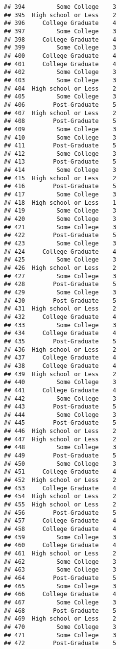 \documentclass[
]{article}
\begin{document}
\begin{verbatim}
## 394         Some College    3
## 395  High school or Less    2
## 396     College Graduate    4
## 397         Some College    3
## 398     College Graduate    4
## 399         Some College    3
## 400     College Graduate    4
## 401     College Graduate    4
## 402         Some College    3
## 403         Some College    3
## 404  High school or Less    2
## 405         Some College    3
## 406        Post-Graduate    5
## 407  High school or Less    2
## 408        Post-Graduate    5
## 409         Some College    3
## 410         Some College    3
## 411        Post-Graduate    5
## 412         Some College    3
## 413        Post-Graduate    5
## 414         Some College    3
## 415  High school or Less    2
## 416        Post-Graduate    5
## 417         Some College    3
## 418  High school or Less    1
## 419         Some College    3
## 420         Some College    3
## 421         Some College    3
## 422        Post-Graduate    5
## 423         Some College    3
## 424     College Graduate    4
## 425         Some College    3
## 426  High school or Less    2
## 427         Some College    3
## 428        Post-Graduate    5
## 429         Some College    3
## 430        Post-Graduate    5
## 431  High school or Less    2
## 432     College Graduate    4
## 433         Some College    3
## 434     College Graduate    4
## 435        Post-Graduate    5
## 436  High school or Less    2
## 437     College Graduate    4
## 438     College Graduate    4
## 439  High school or Less    2
## 440         Some College    3
## 441     College Graduate    4
## 442         Some College    3
## 443        Post-Graduate    5
## 444         Some College    3
## 445        Post-Graduate    5
## 446  High school or Less    2
## 447  High school or Less    2
## 448         Some College    3
## 449        Post-Graduate    5
## 450         Some College    3
## 451     College Graduate    4
## 452  High school or Less    2
## 453     College Graduate    4
## 454  High school or Less    2
## 455  High school or Less    2
## 456        Post-Graduate    5
## 457     College Graduate    4
## 458     College Graduate    4
## 459         Some College    3
## 460     College Graduate    4
## 461  High school or Less    2
## 462         Some College    3
## 463         Some College    3
## 464        Post-Graduate    5
## 465         Some College    3
## 466     College Graduate    4
## 467         Some College    3
## 468        Post-Graduate    5
## 469  High school or Less    2
## 470         Some College    3
## 471         Some College    3
## 472        Post-Graduate    5

\end{verbatim}
\end{document}
